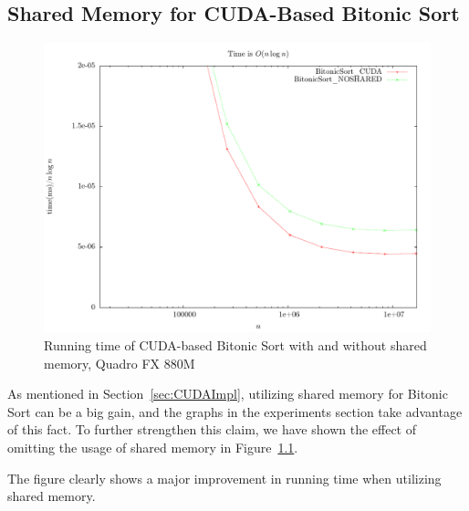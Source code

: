 \FloatBarrier
\begin{appendices}
\chapter{Shared Memory for CUDA-Based Bitonic Sort}
\label{app:CUDABSShared}
\begin{figure}
\center
\includegraphics[width=\textwidth]{graphs/CUDAShared/nlogntime.pdf}
\caption{Running time of CUDA-based Bitonic Sort with and without shared memory, Quadro FX 880M}
\label{fig:CUDAShared}
\end{figure}
As mentioned in Section~\ref{sec:CUDAImpl}, utilizing shared memory for Bitonic Sort can be a big gain, and the graphs in the experiments section take advantage of this fact.
To further strengthen this claim, we have shown the effect of omitting the usage of shared memory in Figure~\ref{fig:CUDAShared}.

The figure clearly shows a major improvement in running time when utilizing shared memory.


\end{appendices}
